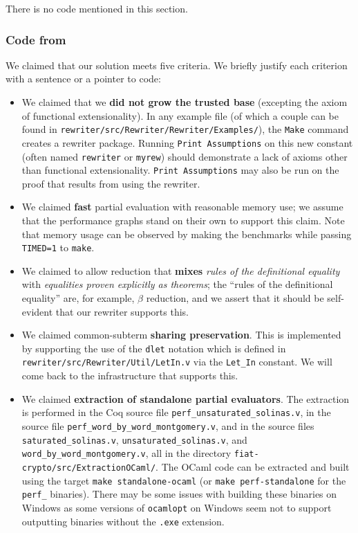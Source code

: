 \documentclass[sigplan,10pt,review,anonymous]{acmart}\settopmatter{printfolios=true,printccs=false,printacmref=false}
\begin{document}
There is no code mentioned in this section.

\subsubsection{Code from }

We claimed that our solution meets five criteria.
We briefly justify each criterion with a sentence or a pointer to code:
\begin{itemize}
  \item
    We claimed that we \textbf{did not grow the trusted base} (excepting the axiom of functional extensionality).
    In any example file (of which a couple can be found in \texttt{rewriter/src/Rewriter/Rewriter/Examples/}), the \texttt{Make} command creates a rewriter package.
    Running \texttt{Print Assumptions} on this new constant (often named \texttt{rewriter} or \texttt{myrew}) should demonstrate a lack of axioms other than functional extensionality.
    \texttt{Print Assumptions} may also be run on the proof that results from using the rewriter.
  \item
    We claimed \textbf{fast} partial evaluation with reasonable memory use; we assume that the performance graphs stand on their own to support this claim.
    Note that memory usage can be observed by making the benchmarks while passing \texttt{TIMED=1} to \texttt{make}.
  \item
    We claimed to allow reduction that \textbf{mixes} \emph{rules of the definitional equality} with \emph{equalities proven explicitly as theorems}; the ``rules of the definitional equality'' are, for example, $\beta$ reduction, and we assert that it should be self-evident that our rewriter supports this.
  \item
    We claimed common-subterm \textbf{sharing preservation}.
    This is implemented by supporting the use of the \texttt{dlet} notation which is defined in \texttt{rewriter/src/Rewriter/Util/LetIn.v} via the \texttt{Let\_In} constant.
    We will come back to the infrastructure that supports this.
  \item
    We claimed \textbf{extraction of standalone partial evaluators}.
    The extraction is performed in the Coq source file \texttt{perf\_unsaturated\_solinas.v}, in the source file \texttt{perf\_word\_by\_word\_montgomery.v}, and in the source files \texttt{saturated\_solinas.v}, \texttt{unsaturated\_solinas.v}, and \texttt{word\_by\_word\_montgomery.v}, all in the directory \texttt{fiat-crypto/src/ExtractionOCaml/}.
    The OCaml code can be extracted and built using the target \texttt{make standalone-ocaml} (or \texttt{make perf-standalone} for the \texttt{perf\_} binaries).
    There may be some issues with building these binaries on Windows as some versions of \texttt{ocamlopt} on Windows seem not to support outputting binaries without the \texttt{.exe} extension.
\end{itemize}
\end{document}
